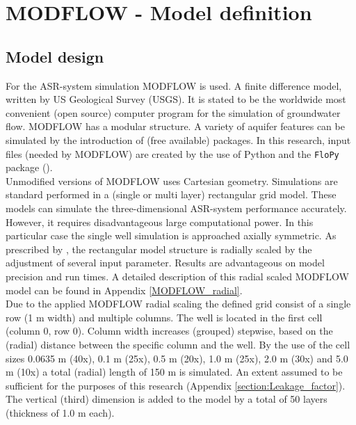 \chapter{MODFLOW - Model definition}
\label{chapter:Extense_Modflow_model}

\section{Model design}
\label{section:MODFLOW_const}
For the ASR-system simulation MODFLOW is used. A finite difference model, written by US Geological Survey (USGS). It is stated to be the worldwide most convenient (open source) computer program for the simulation of groundwater flow. MODFLOW has a modular structure. A variety of aquifer features can be simulated by the introduction of (free available) packages. In this research, input files (needed by MODFLOW) are created by the use of Python and the \texttt{FloPy} package (\citep{Niswonger2011,HarbaughArlen2005}). \\

Unmodified versions of MODFLOW uses Cartesian geometry. Simulations are standard performed in a (single or multi layer) rectangular grid model. These models can simulate the three-dimensional ASR-system performance accurately. However, it requires disadvantageous large computational power. In this particular case the single well simulation is approached axially symmetric. As prescribed by \citet{Langevin2008}, the rectangular model structure is radially scaled by the adjustment of several input parameter. Results are advantageous on model precision and run times. A detailed description of this radial scaled MODFLOW model can be found in Appendix \ref{MODFLOW_radial}. \\

Due to the applied MODFLOW radial scaling the defined grid consist of a single row (1 m width) and multiple columns. The well is located in the first cell (column 0, row 0). Column width increases (grouped) stepwise, based on the (radial) distance between the specific column and the well. By the use of the cell sizes 0.0635 m (40x), 0.1 m (25x), 0.5 m (20x), 1.0 m (25x), 2.0 m (30x) and 5.0 m (10x) a total (radial) length of 150 m is simulated. An extent assumed to be sufficient for the purposes of this research (Appendix \ref{section:Leakage_factor}). The vertical (third) dimension is added to the model by a total of 50 layers (thickness of 1.0 m each). \\

